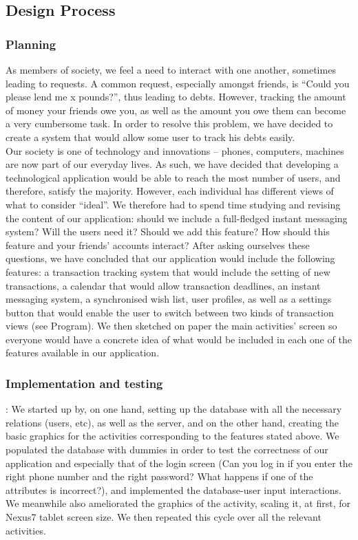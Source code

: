 \documentclass[a4paper,11pt]{article}
\begin{document}
\subsection*{Design Process}
\subsubsection*{Planning}
As members of society, we feel a need to interact with one another, sometimes leading to requests. A common request, especially amongst friends, is “Could you please lend me x pounds?”, thus leading to debts. However, tracking the amount of money your friends owe you, as well as the amount you owe them can become a very cumbersome task. In order to resolve this problem, we have decided to create a system that would allow some user to track his debts easily. \\
Our society is one of technology and innovations – phones, computers, machines are now part of our everyday lives. As such, we have decided that developing a technological application would be able to reach the most number of users, and therefore, satisfy the majority. However, each individual has different views of what to consider “ideal”. We therefore had to spend time studying and revising the content of our application: should we include a full-fledged instant messaging system? Will the users need it? Should we add this feature? How should this feature and your friends’ accounts interact? After asking ourselves these questions, we have concluded that our application would include the following features: a transaction tracking system that would include the setting of new transactions, a calendar that would allow transaction deadlines, an instant messaging system, a synchronised wish list, user profiles, as well as a settings button that would enable the user to switch between two kinds of transaction views (see Program). We then sketched on paper the main activities’ screen so everyone would have a concrete idea of what would be included in each one of the features available in our application.

\subsubsection*{Implementation and testing}:
We started up by, on one hand, setting up the database with all the necessary relations (users, etc), as well as the server, and on the other hand, creating the basic graphics for the activities corresponding to the features stated above. We populated the database with dummies in order to test the correctness of our application and especially that of the login screen (Can you log in if you enter the right phone number and the right password? What happens if one of the attributes is incorrect?), and implemented the database-user input interactions. We meanwhile also ameliorated the graphics of the activity, scaling it, at first, for Nexus7 tablet screen size. We then repeated this cycle over all the relevant activities.
\end{document}
